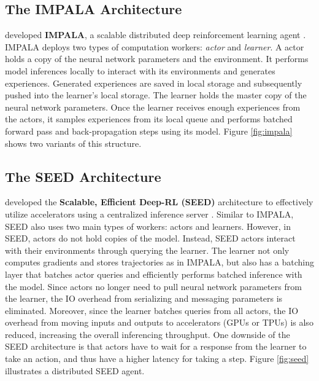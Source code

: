 \subsection{The IMPALA Architecture} \label{sec:impala}
\citeauthor{IMPALAScalableDistributed_Espeholt.Soyer.ea_2018} developed \textbf{IMPALA}, a scalable distributed deep reinforcement learning agent \cite{IMPALAScalableDistributed_Espeholt.Soyer.ea_2018}.
IMPALA deploys two types of computation workers: \textit{actor} and \textit{learner}.
A actor holds a copy of the neural network parameters and the environment.
It performs model inferences locally to interact with its environments and generates experiences.
Generated experiences are saved in local storage and subsequently pushed into the learner's local storage.
The learner holds the master copy of the neural network parameters.
Once the learner receives enough experiences from the actors, it samples experiences from its local queue and performs batched forward pass and back-propagation steps using its model.
Figure \ref{fig:impala} shows two variants of this structure.

\subsection{The SEED Architecture}
\citeauthor{SEEDRLScalable_Espeholt.Marinier.ea_2020} developed the \textbf{Scalable, Efficient Deep-RL (SEED)} architecture to effectively utilize accelerators using a centralized inference server \cite{SEEDRLScalable_Espeholt.Marinier.ea_2020}.
Similar to IMPALA, SEED also uses two main types of workers: actors and learners.
However, in SEED, actors do not hold copies of the model.
Instead, SEED actors interact with their environments through querying the learner.
The learner not only computes gradients and stores trajectories as in IMPALA, but also has a batching layer that batches actor queries and efficiently performs batched inference with the model.
Since actors no longer need to pull neural network parameters from the learner, the IO overhead from serializing and messaging parameters is eliminated.
Moreover, since the learner batches queries from all actors, the IO overhead from moving inputs and outputs to accelerators (GPUs or TPUs) is also reduced, increasing the overall inferencing throughput.
One downside of the SEED architecture is that actors have to wait for a response from the learner to take an action, and thus have a higher latency for taking a step.
Figure \ref{fig:seed} illustrates a distributed SEED agent.


